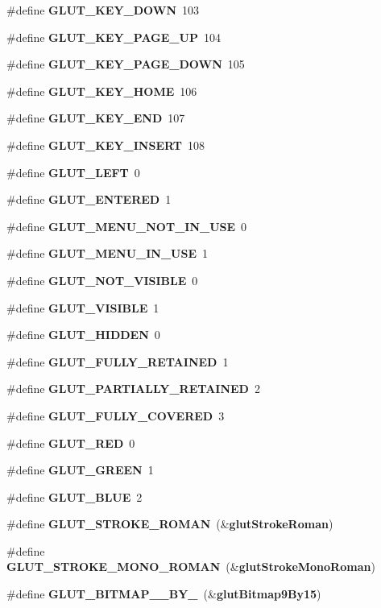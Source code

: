 \begin{DoxyCompactItemize}
\item 
\#define {\bf G\+L\+U\+T\+\_\+\+K\+E\+Y\+\_\+\+D\+O\+WN}~103
\item 
\#define {\bf G\+L\+U\+T\+\_\+\+K\+E\+Y\+\_\+\+P\+A\+G\+E\+\_\+\+UP}~104
\item 
\#define {\bf G\+L\+U\+T\+\_\+\+K\+E\+Y\+\_\+\+P\+A\+G\+E\+\_\+\+D\+O\+WN}~105
\item 
\#define {\bf G\+L\+U\+T\+\_\+\+K\+E\+Y\+\_\+\+H\+O\+ME}~106
\item 
\#define {\bf G\+L\+U\+T\+\_\+\+K\+E\+Y\+\_\+\+E\+ND}~107
\item 
\#define {\bf G\+L\+U\+T\+\_\+\+K\+E\+Y\+\_\+\+I\+N\+S\+E\+RT}~108
\item 
\#define {\bf G\+L\+U\+T\+\_\+\+L\+E\+FT}~0
\item 
\#define {\bf G\+L\+U\+T\+\_\+\+E\+N\+T\+E\+R\+ED}~1
\item 
\#define {\bf G\+L\+U\+T\+\_\+\+M\+E\+N\+U\+\_\+\+N\+O\+T\+\_\+\+I\+N\+\_\+\+U\+SE}~0
\item 
\#define {\bf G\+L\+U\+T\+\_\+\+M\+E\+N\+U\+\_\+\+I\+N\+\_\+\+U\+SE}~1
\item 
\#define {\bf G\+L\+U\+T\+\_\+\+N\+O\+T\+\_\+\+V\+I\+S\+I\+B\+LE}~0
\item 
\#define {\bf G\+L\+U\+T\+\_\+\+V\+I\+S\+I\+B\+LE}~1
\item 
\#define {\bf G\+L\+U\+T\+\_\+\+H\+I\+D\+D\+EN}~0
\item 
\#define {\bf G\+L\+U\+T\+\_\+\+F\+U\+L\+L\+Y\+\_\+\+R\+E\+T\+A\+I\+N\+ED}~1
\item 
\#define {\bf G\+L\+U\+T\+\_\+\+P\+A\+R\+T\+I\+A\+L\+L\+Y\+\_\+\+R\+E\+T\+A\+I\+N\+ED}~2
\item 
\#define {\bf G\+L\+U\+T\+\_\+\+F\+U\+L\+L\+Y\+\_\+\+C\+O\+V\+E\+R\+ED}~3
\item 
\#define {\bf G\+L\+U\+T\+\_\+\+R\+ED}~0
\item 
\#define {\bf G\+L\+U\+T\+\_\+\+G\+R\+E\+EN}~1
\item 
\#define {\bf G\+L\+U\+T\+\_\+\+B\+L\+UE}~2
\item 
\#define {\bf G\+L\+U\+T\+\_\+\+S\+T\+R\+O\+K\+E\+\_\+\+R\+O\+M\+AN}~(\&{\bf glut\+Stroke\+Roman})
\item 
\#define {\bf G\+L\+U\+T\+\_\+\+S\+T\+R\+O\+K\+E\+\_\+\+M\+O\+N\+O\+\_\+\+R\+O\+M\+AN}~(\&{\bf glut\+Stroke\+Mono\+Roman})
\item 
\#define {\bf G\+L\+U\+T\+\_\+\+B\+I\+T\+M\+A\+P\+\_\+\_\+\+B\+Y\+\_}~(\&{\bf glut\+Bitmap9\+By15})
\item 

\end{DoxyCompactItemize}
